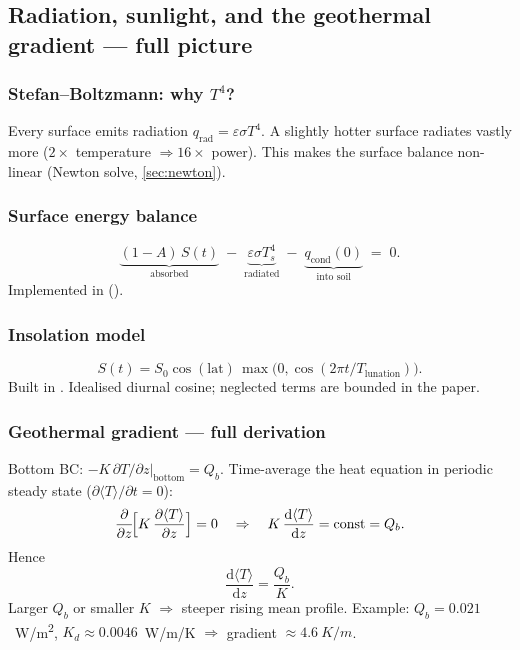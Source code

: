 \subsection{Radiation, sunlight, and the geothermal gradient --- full picture}
\label{sec:boundaries}

\subsubsection{Stefan--Boltzmann: why $T^4$?}
Every surface emits radiation $q_{\mathrm{rad}}=\varepsilon\sigma T^4$. A slightly
hotter surface radiates vastly more ($2\times$ temperature $\Rightarrow 16\times$
power). This makes the surface balance non-linear (Newton solve, \autoref{sec:newton}).

\subsubsection{Surface energy balance}
\begin{equation}
  \underbrace{(1-A)\,S(t)}_{\text{absorbed}}
   \;-\; \underbrace{\varepsilon\sigma T_s^4}_{\text{radiated}}
   \;-\; \underbrace{q_{\mathrm{cond}}(0)}_{\text{into soil}}
   \;=\; 0.
  \label{eq:surface}
\end{equation}
Implemented in  ().

\subsubsection{Insolation model}
\[
  S(t) = S_0\cos(\mathrm{lat})\,\max\!\bigl(0,\cos(2\pi t/T_{\mathrm{lunation}})\bigr).
\]
Built in . Idealised diurnal cosine; neglected terms are bounded in
the paper.

\subsubsection{Geothermal gradient --- full derivation}
Bottom BC: $-K\,\partial T/\partial z|_{\mathrm{bottom}} = Q_b$.
Time-average the heat equation in periodic steady state ($\partial\langle T\rangle/\partial t=0$):
\[
  \frac{\partial}{\partial z}\!\Bigl[K\,\frac{\partial\langle T\rangle}{\partial z}\Bigr]=0
  \quad\Rightarrow\quad K\,\frac{\mathrm{d}\langle T\rangle}{\mathrm{d}z}=\mathrm{const}=Q_b.
\]
Hence
\begin{equation}
  \frac{\mathrm{d}\langle T\rangle}{\mathrm{d}z} = \frac{Q_b}{K}.
  \label{eq:geotherm}
\end{equation}
Larger $Q_b$ or smaller $K$ $\Rightarrow$ steeper rising mean profile. Example:
$Q_b=0.021$~\si{W/m^2}, $K_d\approx 0.0046$~\si{W/m/K} $\Rightarrow$
gradient $\approx\SI{4.6}{K/m}$.

